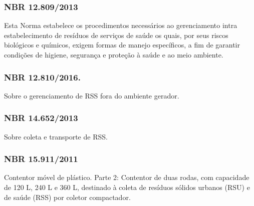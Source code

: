 \begin{subapend}
\begin{subsubapend}
		\subsubsection{NBR 12.809/2013}
		Esta Norma estabelece os procedimentos necessários ao gerenciamento intra estabelecimento de resíduos de serviços de saúde os quais, por seus riscos biológicos e químicos, exigem formas de manejo específicos, a fim de garantir condições de higiene, segurança e proteção à saúde e ao meio ambiente.
		\subsubsection{NBR 12.810/2016.}
		Sobre o gerenciamento de RSS fora do ambiente gerador.
		\subsubsection{NBR 14.652/2013}
		Sobre coleta e transporte de RSS.
		\subsubsection{NBR 15.911/2011}
		Contentor móvel de plástico. Parte 2: Contentor de duas rodas, com capacidade de 120 L, 240 L e 360 L, destinado à coleta de resíduos sólidos urbanos (RSU) e de saúde (RSS) por coletor compactador.
	\end{subsubapend}
\end{subapend}

